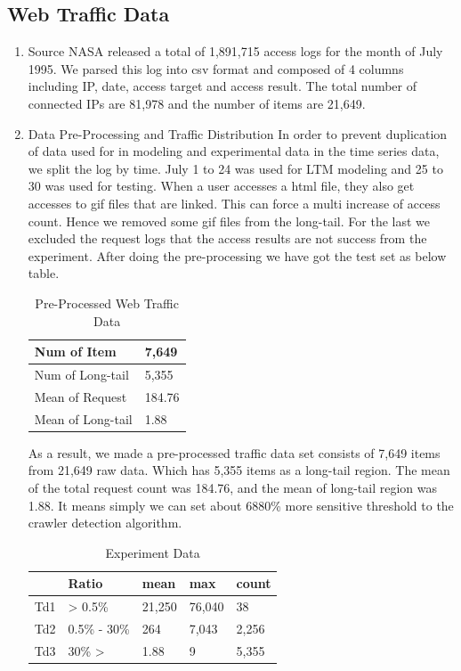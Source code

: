 \documentclass[sigconf,anonymous=true]{acmart}
\begin{document}
\subsection{Web Traffic Data}
\begin{enumerate}
\item Source
\newline NASA released a total of 1,891,715 access logs for the month of July 1995. We parsed this log into csv format and composed of 4 columns including IP, date, access target and access result.
The total number of connected IPs are 81,978 and the number of items are 21,649.
\newline

\item Data Pre-Processing and Traffic Distribution
\newline In order to prevent duplication of data used for in modeling and experimental data in the time series data, we split the log by time. July 1 to 24 was used for LTM modeling and 25 to 30 was used for testing.
When a user accesses a html file, they also get accesses to gif files that are linked. This can force a multi increase of access count. Hence we removed some gif files from the long-tail. For the last we excluded the request logs that the access results are not success from the experiment. After doing the pre-processing we have got the test set as below table.

\begin{table}[H]
  \caption{Pre-Processed Web Traffic Data}
  \label{tab:freq}
    \begin{tabular}{| p{3.1cm} | p{2cm} |}
    \hline
    Num of Item & 7,649 \\ \hline
    Num of Long-tail & 5,355 \\ \hline
    Mean of Request & 184.76 \\ \hline
    Mean of Long-tail & 1.88 \\ \hline
    \end{tabular}
\end{table}

As a result, we made a pre-processed traffic data set consists of 7,649 items from 21,649 raw data. Which has 5,355 items as a long-tail region. The mean of the total request count was 184.76, and the mean of long-tail region was 1.88. It means simply we can set about 6880\% more sensitive threshold to the crawler detection algorithm.\\ 

\begin{table}[H]
  \caption{Experiment Data}
    \begin{tabular}{| l | l | l | l | l | }
    \hline
    & Ratio & mean & max & count \\ \hline
    Td1 &  > 0.5\% & 21,250 & 76,040 & 38 \\ 
    Td2 & 0.5\% - 30\% & 264 & 7,043 & 2,256 \\
    Td3 & 30\% > & 1.88 & 9 & 5,355 \\ \hline
    \end{tabular}
\end{table}


\end{enumerate}
\end{document}
